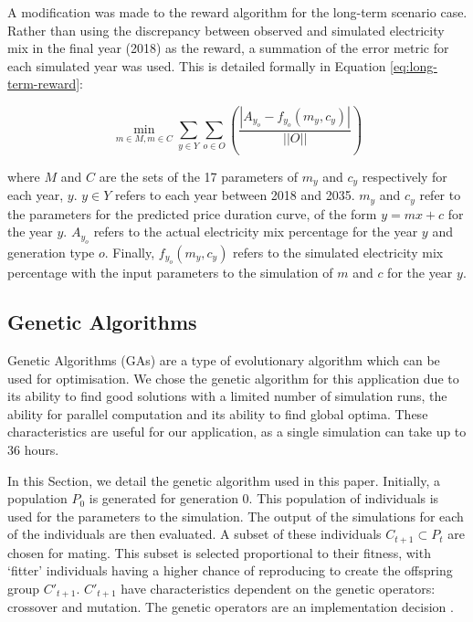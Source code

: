 A modification was made to the reward algorithm for the long-term scenario case. Rather than using the discrepancy between observed and simulated electricity mix in the final year (2018) as the reward, a summation of the error metric for each simulated year was used. This is detailed formally in Equation \ref{eq:long-term-reward}:


\begin{equation}
\label{eq:long-term-reward}
\min_{m\in M,m\in C} 
\sum\limits_{y\in Y}
\sum\limits_{o\in O}\left(
\frac{\left|A_{y_o}-f_{y_o}(m_y,c_y)\right|}
{\left|\left|O\right|\right|}
\right)
\end{equation}

\noindent where $M$ and $C$ are the sets of the 17 parameters of $m_y$ and $c_y$ respectively for each year, $y$. $y\in Y$ refers to each year between 2018 and 2035. $m_y$ and $c_y$ refer to the parameters for the predicted price duration curve, of the form $y=mx+c$ for the year $y$. $A_{y_o}$ refers to the actual electricity mix percentage for the year $y$ and generation type $o$. Finally, $f_{y_o}(m_y,c_y)$ refers to the simulated electricity mix percentage with the input parameters to the simulation of $m$ and $c$ for the year $y$.












\subsection{Genetic Algorithms}
\label{elecsim:ssec:geneticalgorithm}

Genetic Algorithms (GAs) are a type of evolutionary algorithm which can be used for optimisation. We chose the genetic algorithm for this application due to its ability to find good solutions with a limited number of simulation runs, the ability for parallel computation and its ability to find global optima. These characteristics are useful for our application, as a single simulation can take up to 36 hours. 

In this Section, we detail the genetic algorithm used in this paper. Initially, a population $P_{0}$ is generated for generation 0. This population of individuals is used for the parameters to the simulation. The output of the simulations for each of the individuals are then evaluated. A subset of these individuals $C_{t+1} \subset P_{t}$ are chosen for mating. This subset is selected proportional to their fitness, with `fitter' individuals having a higher chance of reproducing to create the offspring group $C'_{t+1}$. $C'_{t+1}$ have characteristics dependent on the genetic operators: crossover and mutation. The genetic operators are an implementation decision \cite{FogelDavidB2009}. 

